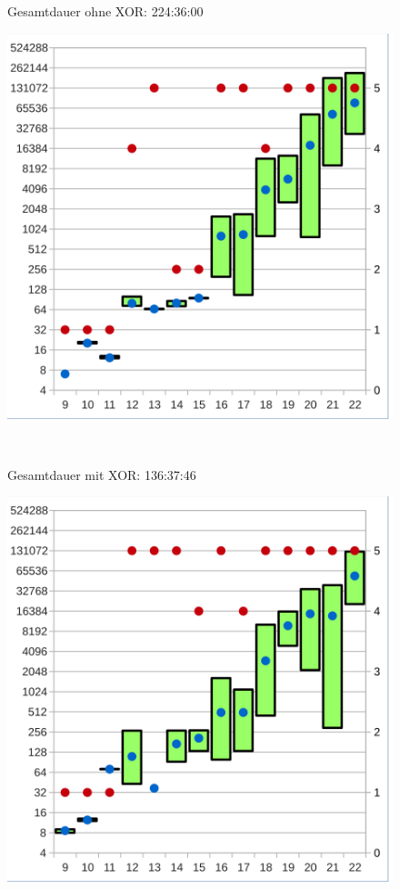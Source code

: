 \begin{figure}[!h]
  \centering
  \begin{minipage}[c]{0.45\textwidth}
  \begin{flushleft}Gesamtdauer ohne XOR: 224:36:00\end{flushleft}
  \includegraphics[scale=0.55]{images/data_final_knf}
  \end{minipage}
  \begin{minipage}[c]{0.09\textwidth}
  ~~
  \end{minipage}
  \begin{minipage}[c]{0.45\textwidth}
  \begin{flushleft}Gesamtdauer mit XOR: 136:37:46\end{flushleft}
  \includegraphics[scale=0.55]{images/data_final_xor}

\end{minipage}
\end{figure}
